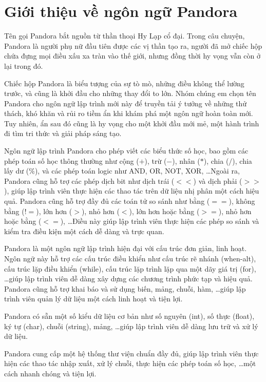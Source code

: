 \section{Giới thiệu về ngôn ngữ Pandora}
Tên gọi Pandora bắt nguồn từ thần thoại Hy Lạp cổ đại. Trong câu chuyện, Pandora là người phụ nữ đầu tiên được các vị thần tạo ra, người đã mở chiếc hộp chứa đựng mọi điều xấu xa tràn vào thế giới, nhưng đồng thời hy vọng vẫn còn ở lại trong đó.

Chiếc hộp Pandora là biểu tượng của sự tò mò, những điều không thể lường trước, và cũng là khởi đầu cho những thay đổi to lớn. Nhóm chúng em chọn tên Pandora cho ngôn ngữ lập trình mới này để truyền tải ý tưởng về những thử thách, khó khăn và rủi ro tiềm ẩn khi khám phá một ngôn ngữ hoàn toàn mới. Tuy nhiên, ẩn sau đó cũng là hy vọng cho một khởi đầu mới mẻ, một hành trình đi tìm tri thức và giải pháp sáng tạo.

Ngôn ngữ lập trình Pandora cho phép viết các biểu thức số học, bao gồm các phép toán số học thông thường như cộng ($+$), trừ ($-$), nhân ($*$), chia ($/$), chia lấy dư ($\%$), và các phép toán logic như AND, OR, NOT, XOR, \dots Ngoài ra, Pandora cũng hỗ trợ các phép dịch bit như dịch trái ($<<$) và dịch phải ($>>$), giúp lập trình viên thực hiện các thao tác trên dữ liệu nhị phân một cách hiệu quả. Pandora cũng hỗ trợ đầy đủ các toán tử so sánh như bằng ($==$), không bằng ($!=$), lớn hơn ($>$), nhỏ hơn ($<$), lớn hơn hoặc bằng ($>=$), nhỏ hơn hoặc bằng ($<=$), \dots Điều này giúp lập trình viên thực hiện các phép so sánh và kiểm tra điều kiện một cách dễ dàng và trực quan.

Pandora là một ngôn ngữ lập trình hiện đại với cấu trúc đơn giản, linh hoạt. Ngôn ngữ này hỗ trợ các cấu trúc điều khiển như cấu trúc rẽ nhánh (when-alt), cấu trúc lặp điều khiển (while), cấu trúc lặp trình lặp qua một dãy giá trị (for), \dots giúp lập trình viên dễ dàng xây dựng các chương trình phức tạp và hiệu quả. Pandora cũng hỗ trợ khai báo và sử dụng biến, mảng, chuỗi, hàm, \dots giúp lập trình viên quản lý dữ liệu một cách linh hoạt và tiện lợi.

Pandora có sẵn một số kiểu dữ liệu cơ bản như số nguyên (int), số thực (float), ký tự (char), chuỗi (string), mảng, \dots giúp lập trình viên dễ dàng lưu trữ và xử lý dữ liệu.

Pandora cung cấp một hệ thống thư viện chuẩn đầy đủ, giúp lập trình viên thực hiện các thao tác nhập xuất, xử lý chuỗi, thực hiện các phép toán số học, \dots một cách nhanh chóng và tiện lợi.

